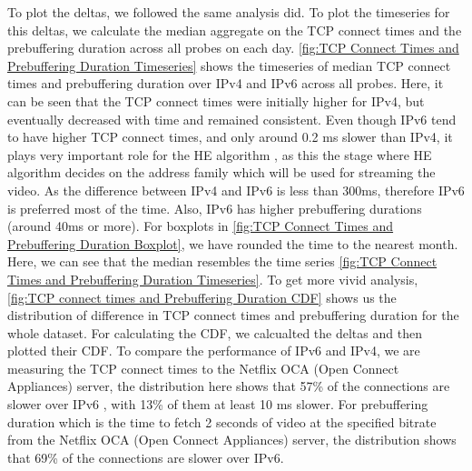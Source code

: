 To plot the deltas, we followed the same analysis \cite{bajpaimeasuring} did. To plot the timeseries for this deltas, we calculate the median aggregate on the TCP connect times and the prebuffering duration across all probes on each day.
\cref{fig:TCP Connect Times and Prebuffering Duration Timeseries} shows the timeseries of median TCP connect times and prebuffering duration over IPv4 and IPv6 across all probes.
Here, it can be seen that the TCP connect times were initially higher for IPv4, but eventually decreased with time and remained consistent. Even though IPv6 tend to have higher TCP connect times,
 and only around 0.2 ms slower than IPv4, it plays very important role for the HE algorithm \cite{rfc6555}, as this the stage where HE algorithm decides on the address family which will be used for streaming the video.
As the difference between IPv4 and IPv6 is less than 300ms, therefore IPv6 is preferred most of the time. Also, IPv6 has higher prebuffering durations (around 40ms or more).
For boxplots in \cref{fig:TCP Connect Times and Prebuffering Duration Boxplot}, we have rounded the time to the nearest month. Here, we can see that the median resembles the time series \cref{fig:TCP Connect Times and Prebuffering Duration Timeseries}.
To get more vivid analysis, \cref{fig:TCP connect times and Prebuffering Duration CDF} shows us the distribution of difference in TCP connect times and prebuffering duration for the whole dataset.
For calculating the CDF, we calcualted the deltas and then plotted their CDF. To compare the performance of IPv6 and IPv4, 
we are measuring the TCP connect times to the Netflix OCA (Open Connect Appliances) server, the distribution here shows that 57\% of the connections are slower over IPv6 , with 13\% of them at least 
10 ms slower. For prebuffering duration which is the time to fetch 2 seconds of video at the specified bitrate from the Netflix OCA (Open Connect Appliances) server, the distribution shows that 69\% of the connections are slower over IPv6.

